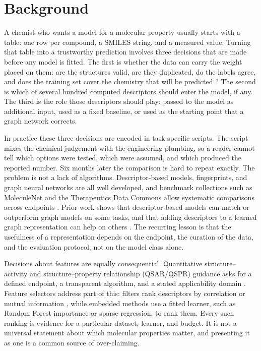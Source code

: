 \section{Background}\label{sec:introduction}

A chemist who wants a model for a molecular property usually starts with a table: one row per compound, a SMILES string, and a measured value. Turning that table into a trustworthy prediction involves three decisions that are made before any model is fitted. The first is whether the data can carry the weight placed on them: are the structures valid, are they duplicated, do the labels agree, and does the training set cover the chemistry that will be predicted \cite{fourches2010trust}? The second is which of several hundred computed descriptors \cite{todeschini2009descriptors,moriwaki2018mordred} should enter the model, if any. The third is the role those descriptors should play: passed to the model as additional input, used as a fixed baseline, or used as the starting point that a graph network corrects.

In practice these three decisions are encoded in task-specific scripts. The script mixes the chemical judgement with the engineering plumbing, so a reader cannot tell which options were tested, which were assumed, and which produced the reported number. Six months later the comparison is hard to repeat exactly. The problem is not a lack of algorithms. Descriptor-based models, fingerprints, and graph neural networks \cite{gilmer2017mpnn,yang2019dmpnn,xu2019gin} are all well developed, and benchmark collections such as MoleculeNet \cite{wu2018moleculenet} and the Therapeutics Data Commons \cite{huang2021tdc} allow systematic comparisons across endpoints \cite{mayr2018largescale,jiang2021gnn,deng2023systematic}. Prior work shows that descriptor-based models can match or outperform graph models on some tasks, and that adding descriptors to a learned graph representation can help on others \cite{aouichaoui2023gcgnn,wieder2020review}. The recurring lesson is that the usefulness of a representation depends on the endpoint, the curation of the data, and the evaluation protocol, not on the model class alone.

Decisions about features are equally consequential. Quantitative structure--activity and structure--property relationship (QSAR/QSPR) guidance asks for a defined endpoint, a transparent algorithm, and a stated applicability domain \cite{oecd2007guidance,tropsha2010best,cherkasov2014qsar}. Feature selectors address part of this: filters rank descriptors by correlation or mutual information \cite{guyon2003introduction,khan2018featureselection,shahlaei2013descriptor,danishuddin2016descriptors}, while embedded methods use a fitted learner, such as Random Forest importance \cite{strobl2007bias} or sparse regression, to rank them. Every such ranking is evidence for a particular dataset, learner, and budget. It is not a universal statement about which molecular properties matter, and presenting it as one is a common source of over-claiming.


